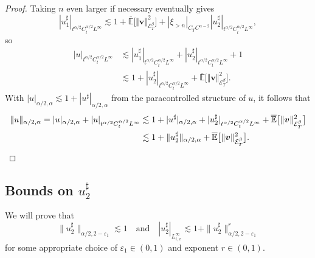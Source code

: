 \documentclass[JEP,XML,SOM,Unicode,published]{cedram}
\theoremstyle{definition}
\let\epsilon\varepsilon
\newcommand\bbE{\mathbb{E}}
\newcommand{\mcE}{\mathcal{E}}
\newcommand{\bsv}{\boldsymbol{v}}
\newcommand{\norme}[1]{\Vert #1 \Vert}
\begin{document}
\begin{proof}
Taking $n$ even larger if necessary eventually gives
\[
| u_1^{\sharp} |_{t^{\alpha / 2} C^{\alpha / 2}_t L^{\infty}} \lesssim 1 + \overline{\bbE}\bigl[\norme{\bsv}^2_{\mcE^\beta_T}\bigr] +
| \xi_{> n} |_{C_T C^{\alpha - 2}} | u_2^{\sharp} |_{t^{\alpha / 2}
C^{\alpha / 2}_t L^{\infty}},
\]
so
\begin{equation}
\begin{aligned}
| u |_{t^{\alpha / 2} C^{\alpha / 2}_t L^{\infty}} &\lesssim | u_1^{\sharp}
|_{t^{\alpha / 2} C^{\alpha / 2}_t L^{\infty}} + | u_2^{\sharp} |_{t^{\alpha
/ 2} C^{\alpha / 2}_t L^{\infty}} + 1\\
&\lesssim 1 + | u_2^{\sharp}
|_{t^{\alpha / 2} C^{\alpha / 2}_t L^{\infty}} +\overline{\bbE}\bigl[\norme{\bsv}^2_{\mcE^\beta_T}\bigr].
\end{aligned}
\end{equation}
With $| u |_{\alpha / 2, \alpha} \lesssim 1 + |
u^{\sharp} |_{\alpha / 2, \alpha}$ from the paracontrolled structure of $u$,
it follows that
\begin{align*} \| u \|_{\alpha / 2, \alpha} = | u |_{\alpha / 2, \alpha} + | u
|_{t^{\alpha / 2} C^{\alpha / 2}_t L^{\infty}} &\lesssim 1 + | u^{\sharp}
|_{\alpha / 2, \alpha} + | u_2^{\sharp} |_{t^{\alpha / 2} C^{\alpha / 2}_t
L^{\infty}} + \overline{\bbE}\bigl[\norme{\bsv}^2_{\mcE^\beta_T}\bigr]
\\
&\lesssim 1 + \| u_2^{\sharp} \|_{\alpha / 2, \alpha} + \overline{\bbE}\bigl[\norme{\bsv}^2_{\mcE^\beta_T}\bigr].\qedhere
\end{align*}
\end{proof}

\subsection{Bounds on $u_2^{\sharp}$}

We will prove that
\[
\| u_2^{\sharp} \|_{\alpha / 2, 2 - \epsilon_1} \lesssim 1\quad\text{and}\quad | u_2^{\sharp} |_{L^{\infty}_{t, x}} \lesssim 1 + \| u_2^{\sharp} \|^r_{\alpha / 2, 2 - \epsilon_1}
\]
for some appropriate choice of $\epsilon_1\in(0,1)$ and exponent $r\in(0,1)$.
\end{document}
